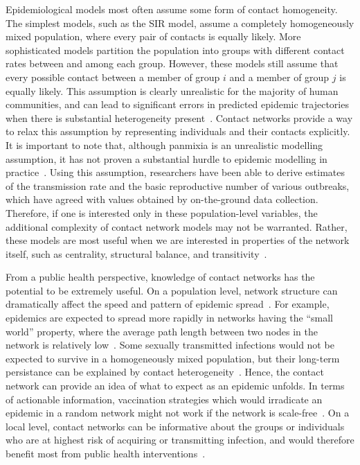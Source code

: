 Epidemiological models most often assume some form of contact homogeneity. The
simplest models, such as the \gls{SIR} model, assume a completely homogeneously
mixed population, where every pair of contacts is equally likely. More
sophisticated models partition the population into groups with different
contact rates between and among each group. However, these models still assume
that every possible contact between a member of group $i$ and a member of group
$j$ is equally likely. This assumption is clearly unrealistic for the majority
of human communities, and can lead to significant errors in predicted epidemic
trajectories when there is substantial heterogeneity
present~\autocite{bansal2007individual, volz2007susceptible}. Contact networks
provide a way to relax this assumption by representing individuals and their
contacts explicitly. It is important to note that, although panmixia is an
unrealistic modelling assumption, it has not proven a substantial hurdle to
epidemic modelling in practice~\autocite{anderson1992infectious}. Using this
assumption, researchers have been able to derive estimates of the transmission
rate and the basic reproductive number of various outbreaks, which have agreed
with values obtained by on-the-ground data collection. Therefore, if one is
interested only in these population-level variables, the additional complexity
of contact network models may not be warranted. Rather, these models are most
useful when we are interested in properties of the network itself, such as
centrality, structural balance, and
transitivity~\autocite{wasserman1994social}.

From a public health perspective, knowledge of contact networks has the
potential to be extremely useful. On a population level, network structure can
dramatically affect the speed and pattern of epidemic
spread~\autocite[\eg][]{barthelemy2005dynamical, volz2008sir}. For example,
epidemics are expected to spread more rapidly in networks having the ``small
world'' property, where the average path length between two nodes in the
network is relatively low~\autocite{watts1998collective}. Some sexually
transmitted infections would not be expected to survive in a homogeneously
mixed population, but their long-term persistance can be explained by contact
heterogeneity~\autocite{anderson1992infectious, pastor2001epidemic}. Hence, the
contact network can provide an idea of what to expect as an epidemic unfolds.
In terms of actionable information, vaccination strategies which would
irradicate an epidemic in a random network might not work if the network is
scale-free~\autocite[][see \cref{subsec:pa}]{keeling2005networks}. On a local
level, contact networks can be informative about the groups or individuals who
are at highest risk of acquiring or transmitting infection, and would therefore
benefit most from public health interventions~\autocite{wang2015targeting,
little2014using}.

